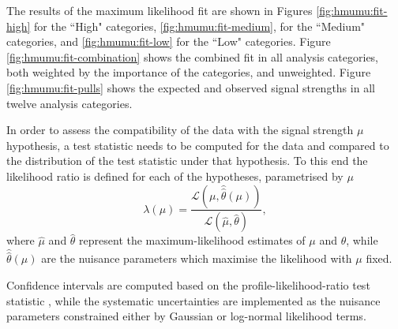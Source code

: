 The results of the maximum likelihood fit are shown in Figures
\ref{fig:hmumu:fit-high} for the ``High" categories,
\ref{fig:hmumu:fit-medium}, for the ``Medium" categories, 
and \ref{fig:hmumu:fit-low} for the ``Low" categories.
Figure \ref{fig:hmumu:fit-combination} shows the combined fit in
all analysis categories, both weighted by the importance of the
categories, and unweighted. Figure \ref{fig:hmumu:fit-pulls}
shows the expected and observed signal strengths in all
twelve analysis categories.

In order to assess the compatibility of the data with the 
signal strength $\mu$ hypothesis, a test statistic needs to be computed
for the data and compared to the distribution of the test statistic
under that hypothesis. To this end the likelihood ratio is defined
for each of the hypotheses, parametrised by $\mu$
\begin{equation}
\lambda(\mu) =
\frac{\mathcal{L}(\mu, \hat{\hat\theta}(\mu))}
     {\mathcal{L}(\hat\mu, \hat\theta)},
\end{equation}
where $\hat\mu$ and $\hat\theta$ represent the maximum-likelihood
estimates of $\mu$ and $\theta$, while $\hat{\hat\theta}(\mu)$
are the nuisance parameters which maximise the likelihood with
$\mu$ fixed.


Confidence intervals are
computed based on the profile-likelihood-ratio test statistic
\cite{Cowan:2010js}, while the systematic uncertainties are
implemented as the nuisance parameters constrained either by
Gaussian or log-normal likelihood terms.


